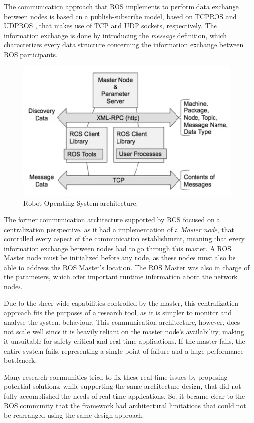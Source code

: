 The communication approach that ROS implements to perform data exchange between nodes is based on a publish-subscribe model, based on TCPROS \cite{tcpros} and UDPROS \cite{udpros}, that makes use of TCP and UDP sockets, respectively. \cite{maruyama2016exploring} The information exchange is done by introducing the \textit{message} definition, which characterizes every data structure concerning the information exchange between ROS participants.

\begin{figure}[H]
        \centering
        \includegraphics[width=0.5\linewidth]{images/former-ros1-architecture.png}
        \caption{Robot Operating System architecture.}
        \label{fig:ros1-architecture}
\end{figure}

The former communication architecture supported by ROS focused on a centralization perspective, as it had a implementation of a \textit{Master node}, that controlled every aspect of the communication establishment, meaning that every information exchange between nodes had to go through this master. A ROS Master node must be initialized before any node, as these nodes must also be able to address the ROS Master's location. The ROS Master was also in charge of the parameters, which offer important runtime information about the network nodes.

Due to the sheer wide capabilities controlled by the master, this centralization approach fits the purposes of a research tool, as it is simpler to monitor and analyse the system behaviour. This communication architecture, however, does not scale well since it is heavily reliant on the master node's availability, making it unsuitable for safety-critical and real-time applications. If the master fails, the entire system fails, representing a single point of failure and a huge performance bottleneck.

Many research communities tried to fix these real-time issues by proposing potential solutions, while supporting the same architecture design, that did not fully accomplished the needs of real-time applications. So, it became clear to the ROS community that the framework had architectural limitations that could not be rearranged using the same design approach. \cite{maruyama2016exploring}

